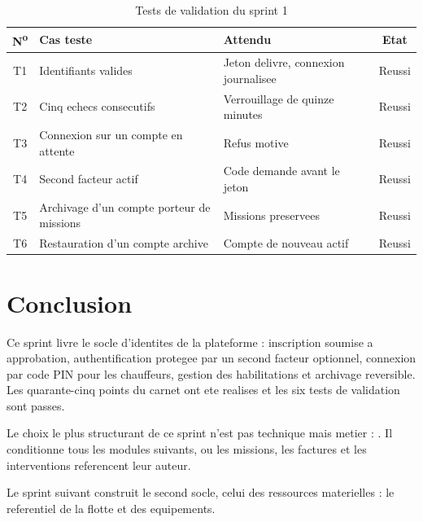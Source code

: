 \begin{table}[H]
\centering
\caption{Tests de validation du sprint 1}
\label{tab:tests-s1}
\small
\begin{tabularx}{\textwidth}{@{}cXp{3.0cm}c@{}}
\toprule
\textbf{N\textsuperscript{o}} & \textbf{Cas teste} & \textbf{Attendu} &
\textbf{Etat} \\ \midrule
T1 & Identifiants valides & Jeton delivre, connexion journalisee & Reussi \\
T2 & Cinq echecs consecutifs & Verrouillage de quinze minutes & Reussi \\
T3 & Connexion sur un compte en attente & Refus motive & Reussi \\
T4 & Second facteur actif & Code demande avant le jeton & Reussi \\
T5 & Archivage d'un compte porteur de missions & Missions preservees & Reussi \\
T6 & Restauration d'un compte archive & Compte de nouveau actif & Reussi \\
\bottomrule
\end{tabularx}
\end{table}

\section*{Conclusion}

Ce sprint livre le socle d'identites de la plateforme : inscription
soumise a approbation, authentification protegee par un second facteur
optionnel, connexion par code PIN pour les chauffeurs, gestion des
habilitations et archivage reversible. Les quarante-cinq points du carnet
ont ete realises et les six tests de validation sont passes.

Le choix le plus structurant de ce sprint n'est pas technique mais
metier : . Il conditionne tous les modules suivants, ou les missions,
les factures et les interventions referencent leur auteur.

Le sprint suivant construit le second socle, celui des ressources
materielles : le referentiel de la flotte et des equipements.

